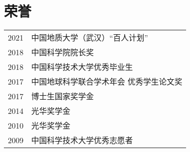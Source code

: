 \section{荣誉}

\begin{tabular}{p{} p{}}
2021 & 中国地质大学（武汉）“百人计划” \\
2018 & 中国科学院院长奖 \\
2018 & 中国科学技术大学优秀毕业生 \\
2017 & 中国地球科学联合学术年会 优秀学生论文奖 \\
2017 & 博士生国家奖学金 \\
2014 & 光华奖学金 \\
2010 & 光华奖学金 \\
2009 & 中国科学技术大学优秀志愿者 \\
\end{tabular}
